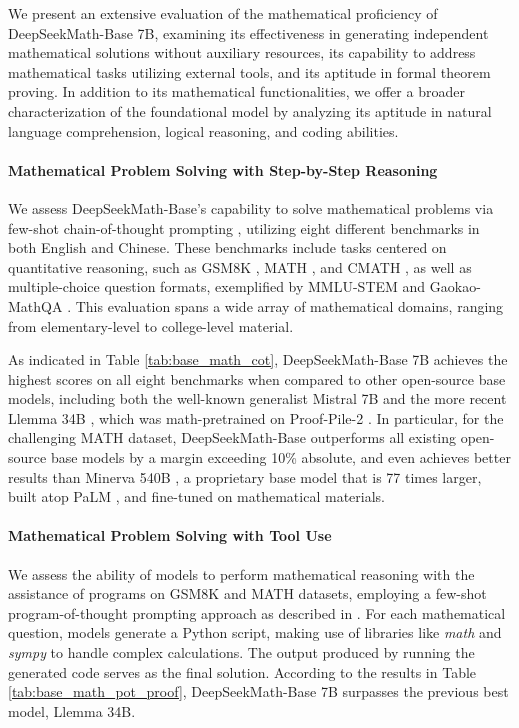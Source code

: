 \begin{itemize}[topsep=0pt]
We present an extensive evaluation of the mathematical proficiency of DeepSeekMath-Base 7B, examining its effectiveness in generating independent mathematical solutions without auxiliary resources, its capability to address mathematical tasks utilizing external tools, and its aptitude in formal theorem proving. In addition to its mathematical functionalities, we offer a broader characterization of the foundational model by analyzing its aptitude in natural language comprehension, logical reasoning, and coding abilities.

\paragraph{Mathematical Problem Solving with Step-by-Step Reasoning}

We assess DeepSeekMath-Base's capability to solve mathematical problems via few-shot chain-of-thought prompting \citep{cot}, utilizing eight different benchmarks in both English and Chinese. These benchmarks include tasks centered on quantitative reasoning, such as GSM8K \citep{gsm8k}, MATH \citep{MATH}, and CMATH \citep{wei2023cmath}, as well as multiple-choice question formats, exemplified by MMLU-STEM \citep{mmlu} and Gaokao-MathQA \citep{agieval}. This evaluation spans a wide array of mathematical domains, ranging from elementary-level to college-level material.

As indicated in Table \ref{tab:base_math_cot}, DeepSeekMath-Base 7B achieves the highest scores on all eight benchmarks when compared to other open-source base models, including both the well-known generalist Mistral 7B \citep{mistral} and the more recent Llemma 34B \citep{llemma}, which was math-pretrained on Proof-Pile-2 \citep{llemma}. In particular, for the challenging MATH dataset, DeepSeekMath-Base outperforms all existing open-source base models by a margin exceeding 10\% absolute, and even achieves better results than Minerva 540B \citep{minerva}, a proprietary base model that is 77 times larger, built atop PaLM \citep{palm}, and fine-tuned on mathematical materials.

\paragraph{Mathematical Problem Solving with Tool Use} We assess the ability of models to perform mathematical reasoning with the assistance of programs on GSM8K and MATH datasets, employing a few-shot program-of-thought prompting approach as described in \citep{pot,pal}. For each mathematical question, models generate a Python script, making use of libraries like \textit{math} and \textit{sympy} to handle complex calculations. The output produced by running the generated code serves as the final solution. According to the results in Table \ref{tab:base_math_pot_proof}, DeepSeekMath-Base 7B surpasses the previous best model, Llemma 34B.


\end{itemize}

